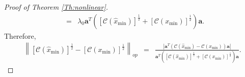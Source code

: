 \documentclass[12pt]{article}
\theoremstyle{plain}
\theoremstyle{remark}
\begin{document}
\begin{proof}[Proof of Theorem \ref{Th:nonlinear}]
\begin{eqnarray*}
        &=&\lambda_0\mathbf{a}^T\left([\mathscr{C}(\hat{x}_{\min})]^{\frac{1}{2}}+[\mathscr{C}(x_{\min})]^{\frac{1}{2}}\right)\mathbf{a}.
    \end{eqnarray*}
    Therefore,
    \begin{eqnarray*}
        \left\|[\mathscr{C}(\hat{x}_{\min})]^{\frac{1}{2}}-[\mathscr{C}(x_{\min})]^{\frac{1}{2}}\right\|_{op}&=&\frac{\left|\mathbf{a}^T\left(\mathscr{C}(\hat{x}_{\min})-\mathscr{C}(x_{\min})\right)\mathbf{a}\right|}{\mathbf{a}^T\left([\mathscr{C}(\hat{x}_{\min})]^{\frac{1}{2}}+[\mathscr{C}(x_{\min})]^{\frac{1}{2}}\right)\mathbf{a}}.%
    \end{eqnarray*}



\end{proof}
\end{document}
